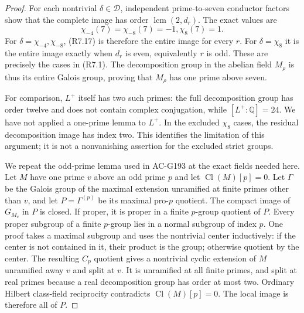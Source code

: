 \begin{proof}
For each nontrivial $\delta\in\mathcal D$, independent
prime-to-seven conductor factors show that the complete image
has order $\operatorname{lcm}(2,d_r)$.
The exact values are
\[
                 \chi_{-4}(7)=\chi_{-8}(7)=-1,
                         \chi_8(7)=1.
 \tag{R7.18}
\]
For $\delta=\chi_{-4},\chi_{-8}$, (R7.17) is therefore the
entire image for every $r$. For $\delta=\chi_8$ it is the
entire image exactly when $d_r$ is even, equivalently $r$ is odd.
These are precisely the cases in (R7.1).
The decomposition group in the abelian field $M_\rho$ is thus
its entire Galois group, proving that $M_\rho$ has one prime above seven.

For comparison, $L^+$ itself has two such primes: the full
decomposition group has order twelve and does not contain
complex conjugation, while $[L^+:\mathbb Q]=24$.
We have not applied a one-prime lemma to $L^+$.
In the excluded $\chi_8$ cases, the residual decomposition image
has index two. This identifies the limitation of this argument;
it is not a nonvanishing assertion for the excluded strict groups.

We repeat the odd-prime lemma used in AC-G193 at the exact fields
needed here. Let $M$ have one prime $v$ above an odd prime $p$
and let $\operatorname{Cl}(M)[p]=0$.
Let $\Gamma$ be the Galois group of the maximal extension
unramified at finite primes other than $v$, and let
$P=\Gamma^{(p)}$ be its maximal pro-$p$ quotient.
The compact image of $G_{M_v}$ in $P$ is closed.
If proper, it is proper in a finite $p$-group quotient of $P$.
Every proper subgroup of a finite $p$-group lies in a normal
subgroup of index $p$. One proof takes a maximal subgroup and
uses the nontrivial center inductively: if the center is not
contained in it, their product is the group; otherwise quotient
by the center. The resulting $C_p$ quotient gives a nontrivial
cyclic extension of $M$ unramified away $v$ and split at $v$.
It is unramified at all finite primes, and split at real primes
because a real decomposition group has order at most two.
Ordinary Hilbert class-field reciprocity contradicts
$\operatorname{Cl}(M)[p]=0$. The local image is therefore all of $P$.


\end{proof}
